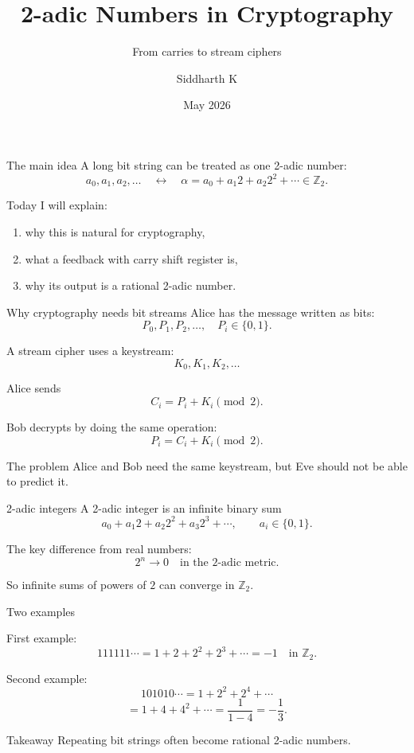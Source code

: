 \documentclass[aspectratio=169]{beamer}
\title[2-adic Numbers in Cryptography]{2-adic Numbers in Cryptography}
\subtitle{From carries to stream ciphers}
\author{Siddharth K}
\date{May 2026}
\newcommand{\Ztwo}{\mathbb{Z}_2}
\begin{document}
\begin{frame}
  \titlepage
\end{frame}

\begin{frame}{The main idea}
\large
A long bit string can be treated as one 2-adic number:
\[
  a_0,a_1,a_2,\ldots
  \quad\longleftrightarrow\quad
  \alpha = a_0+a_1 2+a_2 2^2+\cdots \in \Ztwo.
\]

\vspace{0.4cm}
Today I will explain:
\begin{enumerate}
  \item why this is natural for cryptography,
  \item what a feedback with carry shift register is,
  \item why its output is a rational 2-adic number.
\end{enumerate}
\end{frame}

\begin{frame}{Why cryptography needs bit streams}
Alice has the message written as bits:
\[
  P_0, P_1, P_2, \ldots, \quad P_i \in \{0, 1\}.
\]

A stream cipher uses a keystream:
\[
  K_0,K_1,K_2,\ldots
\]

Alice sends
\[
  C_i = P_i + K_i \pmod 2.
\]

Bob decrypts by doing the same operation:
\[
  P_i = C_i + K_i \pmod 2.
\]

\begin{block}{The problem}
Alice and Bob need the same keystream, but Eve should not be able to predict it.
\end{block}
\end{frame}

\begin{frame}{2-adic integers}
A 2-adic integer is an infinite binary sum
\[
  a_0+a_1 2+a_2 2^2+a_3 2^3+\cdots,
  \qquad a_i\in\{0,1\}.
\]

\vspace{0.2cm}
The key difference from real numbers:
\[
  2^n \to 0 \quad \text{in the 2-adic metric.}
\]

So infinite sums of powers of $2$ can converge in $\Ztwo$.
\end{frame}

\begin{frame}{Two examples}

\vspace{0.2cm}
First example:
\[
  111111\cdots = 1+2+2^2+2^3+\cdots = -1 \quad \text{in }\Ztwo.
\]

Second example:
\[
  101010\cdots = 1+2^2+2^4+\cdots
\]
\[
  = 1+4+4^2+\cdots
  = \frac{1}{1-4}
  = -\frac{1}{3}.
\]

\begin{block}{Takeaway}
Repeating bit strings often become rational 2-adic numbers.
\end{block}
\end{frame}
\end{document}
